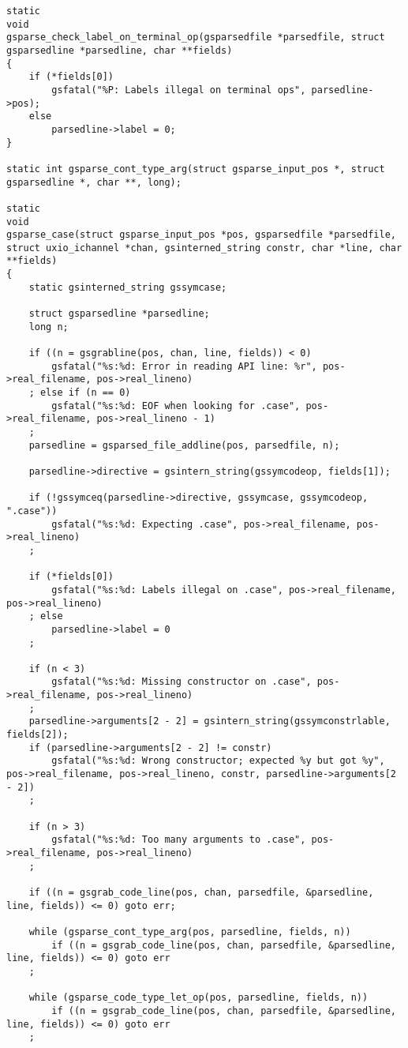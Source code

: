 \documentclass{report}
\begin{document}
\begin{verbatim}
static
void
gsparse_check_label_on_terminal_op(gsparsedfile *parsedfile, struct gsparsedline *parsedline, char **fields)
{
    if (*fields[0])
        gsfatal("%P: Labels illegal on terminal ops", parsedline->pos);
    else
        parsedline->label = 0;
}

static int gsparse_cont_type_arg(struct gsparse_input_pos *, struct gsparsedline *, char **, long);

static
void
gsparse_case(struct gsparse_input_pos *pos, gsparsedfile *parsedfile, struct uxio_ichannel *chan, gsinterned_string constr, char *line, char **fields)
{
    static gsinterned_string gssymcase;

    struct gsparsedline *parsedline;
    long n;

    if ((n = gsgrabline(pos, chan, line, fields)) < 0)
        gsfatal("%s:%d: Error in reading API line: %r", pos->real_filename, pos->real_lineno)
    ; else if (n == 0)
        gsfatal("%s:%d: EOF when looking for .case", pos->real_filename, pos->real_lineno - 1)
    ;
    parsedline = gsparsed_file_addline(pos, parsedfile, n);

    parsedline->directive = gsintern_string(gssymcodeop, fields[1]);

    if (!gssymceq(parsedline->directive, gssymcase, gssymcodeop, ".case"))
        gsfatal("%s:%d: Expecting .case", pos->real_filename, pos->real_lineno)
    ;

    if (*fields[0])
        gsfatal("%s:%d: Labels illegal on .case", pos->real_filename, pos->real_lineno)
    ; else
        parsedline->label = 0
    ;

    if (n < 3)
        gsfatal("%s:%d: Missing constructor on .case", pos->real_filename, pos->real_lineno)
    ;
    parsedline->arguments[2 - 2] = gsintern_string(gssymconstrlable, fields[2]);
    if (parsedline->arguments[2 - 2] != constr)
        gsfatal("%s:%d: Wrong constructor; expected %y but got %y", pos->real_filename, pos->real_lineno, constr, parsedline->arguments[2 - 2])
    ;

    if (n > 3)
        gsfatal("%s:%d: Too many arguments to .case", pos->real_filename, pos->real_lineno)
    ;

    if ((n = gsgrab_code_line(pos, chan, parsedfile, &parsedline, line, fields)) <= 0) goto err;

    while (gsparse_cont_type_arg(pos, parsedline, fields, n))
        if ((n = gsgrab_code_line(pos, chan, parsedfile, &parsedline, line, fields)) <= 0) goto err
    ;

    while (gsparse_code_type_let_op(pos, parsedline, fields, n))
        if ((n = gsgrab_code_line(pos, chan, parsedfile, &parsedline, line, fields)) <= 0) goto err
    ;


\end{verbatim}
\end{document}
